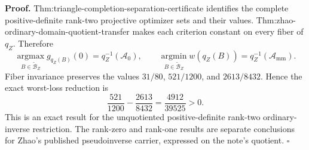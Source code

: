 \textbf{Proof.}
Thm:triangle-completion-separation-certificate identifies the complete positive-definite rank-two projective optimizer sets and their values.  Thm:zhao-ordinary-domain-quotient-transfer makes each criterion constant on every fiber of \(q_Z\).  Therefore
\[
\operatorname*{argmax}_{B\in\widetilde{\mathcal B}_Z}g_{q_Z(B)}(0)
=q_Z^{-1}(\mathcal A_0),
\qquad
\operatorname*{argmin}_{B\in\widetilde{\mathcal B}_Z}w(q_Z(B))
=q_Z^{-1}(\mathcal A_{\mathrm{mm}}).
\]
Fiber invariance preserves the values \(31/80\), \(521/1200\), and \(2613/8432\).  Hence the exact worst-loss reduction is
\[
\frac{521}{1200}-\frac{2613}{8432}
=\frac{4912}{39525}>0.
\]
This is an exact result for the unquotiented positive-definite rank-two ordinary-inverse restriction.  The rank-zero and rank-one results are separate conclusions for Zhao's published pseudoinverse carrier, expressed on the note's quotient.  \(\square\)